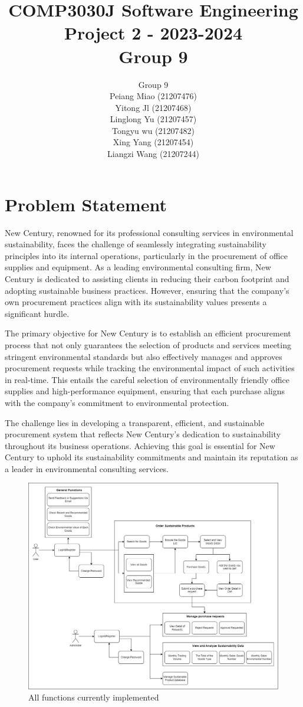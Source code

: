 \documentclass{article}
\title{COMP3030J Software Engineering Project 2 - 2023-2024 \\ Group 9}
\author{Group 9\\
Peiang Miao (21207476)\\
Yitong Jl (21207468)\\
Linglong Yu (21207457)\\
Tongyu wu (21207482)\\
Xing Yang (21207454)\\
Liangzi Wang (21207244)}
\date{}
\begin{document}
\maketitle
{}
\tableofcontents
\newpage
{}

\section{Problem Statement}
New Century, renowned for its professional consulting services in environmental sustainability, faces the challenge of seamlessly integrating sustainability principles into its internal operations, particularly in the procurement of office supplies and equipment. As a leading environmental consulting firm, New Century is dedicated to assisting clients in reducing their carbon footprint and adopting sustainable business practices. However, ensuring that the company's own procurement practices align with its sustainability values presents a significant hurdle.

The primary objective for New Century is to establish an efficient procurement process that not only guarantees the selection of products and services meeting stringent environmental standards but also effectively manages and approves procurement requests while tracking the environmental impact of such activities in real-time. This entails the careful selection of environmentally friendly office supplies and high-performance equipment, ensuring that each purchase aligns with the company's commitment to environmental protection.

The challenge lies in developing a transparent, efficient, and sustainable procurement system that reflects New Century's dedication to sustainability throughout its business operations. Achieving this goal is essential for New Century to uphold its sustainability commitments and maintain its reputation as a leader in environmental consulting services.

\begin{figure}[h]
    \centering
    \includegraphics[width=1\textwidth]{figure1.png}
    \caption{All functions currently implemented}
    \label{image-myimage}
    \end{figure}
\end{document}
